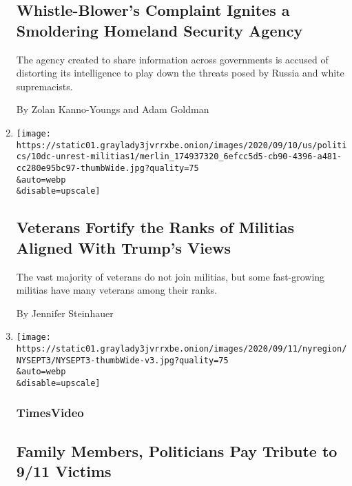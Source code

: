 \begin{enumerate}
{  \subsection{Whistle-Blower's Complaint Ignites a Smoldering Homeland
  Security
  Agency}\label{whistle-blowers-complaint-ignites-a-smoldering-homeland-security-agency-1}}

  The agency created to share information across governments is accused
  of distorting its intelligence to play down the threats posed by
  Russia and white supremacists.

  By Zolan Kanno-Youngs and Adam Goldman
\item
  \href{/2020/09/11/us/politics/veterans-trump-protests-militias.html}{}

  \texttt{[image: https://static01.graylady3jvrrxbe.onion/images/2020/09/10/us/politics/10dc-unrest-militias1/merlin\_174937320\_6efcc5d5-cb90-4396-a481-cc280e95bc97-thumbWide.jpg?quality=75\\\&auto=webp\\\&disable=upscale]}

  \hypertarget{veterans-fortify-the-ranks-of-militias-aligned-with-trumps-views-1}{%
  \subsection{Veterans Fortify the Ranks of Militias Aligned With
  Trump's
  Views}\label{veterans-fortify-the-ranks-of-militias-aligned-with-trumps-views-1}}

  The vast majority of veterans do not join militias, but some
  fast-growing militias have many veterans among their ranks.

  By Jennifer Steinhauer
\item
  \href{/video/us/politics/100000007336141/nyc-911-anniversary.html}{}

  \texttt{[image: https://static01.graylady3jvrrxbe.onion/images/2020/09/11/nyregion/NYSEPT3/NYSEPT3-thumbWide-v3.jpg?quality=75\\\&auto=webp\\\&disable=upscale]}

  \hypertarget{timesvideo-3}{%
  \subsubsection{TimesVideo}\label{timesvideo-3}}

  \hypertarget{family-members-politicians-pay-tribute-to-911-victims}{%
  \subsection{Family Members, Politicians Pay Tribute to 9/11
  Victims}\label{family-members-politicians-pay-tribute-to-911-victims}}


\end{enumerate}

